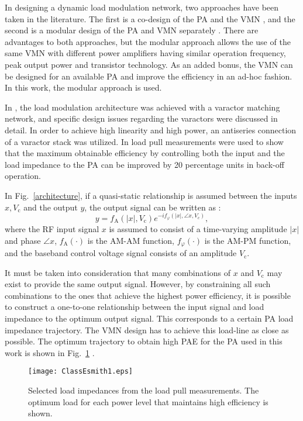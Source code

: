 \documentclass[10pt,journal]{IEEEtran}
\begin{document}
In designing a dynamic load modulation network, two approaches have been taken in the literature. The first is a co-design of the PA and the VMN \cite{fuMTT}, and the second is a modular design of the PA and VMN separately \cite{hosseinMTT}. There are advantages to both approaches, but the modular approach allows the use of the same VMN with different power amplifiers having similar operation frequency, peak output power and transistor technology. As an added bonus, the VMN can be designed for an available PA and improve the efficiency in an ad-hoc fashion. In this work, the modular approach is used.

In \cite{hosseinMTT}, the load modulation architecture was achieved with a varactor matching network, and specific design issues regarding the varactors were discussed in detail. In order to achieve high linearity and high power, an antiseries connection of a varactor stack was utilized. In \cite{hosseinEMW} load pull measurements were used to show that the maximum obtainable efficiency by controlling both the input and the load impedance to the PA can be improved by 20 percentage units in back-off operation.

In Fig.~\ref{architecture}, if a quasi-static relationship is assumed between the inputs $x, V_\text{c}$ and the output $y$, the output signal can be written as \cite{soltani}:
\begin{equation}
y = f_{\text{A}}\left(|x|,V_\text{c}\right)e^{-if_{\varphi}\left(|x|,\angle x,V_c \right)},
\label{y_x}
\end{equation}
where the RF input signal $x$ is assumed to consist of a time-varying amplitude $|x|$ and phase $\angle{x}$, $f_\text{A}\left(\cdot\right)$ is the AM-AM function, $f_\varphi\left(\cdot\right)$ is the AM-PM function, and the baseband control voltage signal consists of an amplitude $V_\text{c}$.

It must be taken into consideration that many combinations of $x$ and $V_\text{c}$ may exist to provide the same output signal. However, by constraining all such combinations to the ones that achieve the highest power efficiency, it is possible to construct a one-to-one relationship between the input signal and load impedance to the optimum output signal. This corresponds to a certain PA load impedance trajectory. The VMN design has to achieve this load-line as close as possible. The optimum trajectory to obtain high PAE for the PA used in this work is shown in Fig.~\ref{classEsmith} \cite{hosseinMTT}.

\begin{figure}
\centering
\texttt{[image: ClassEsmith1.eps]}
\caption{Selected load impedances from the load pull measurements. The optimum load for each power level that maintains high efficiency is shown.}
\label{classEsmith}
\end{figure}
\end{document}

